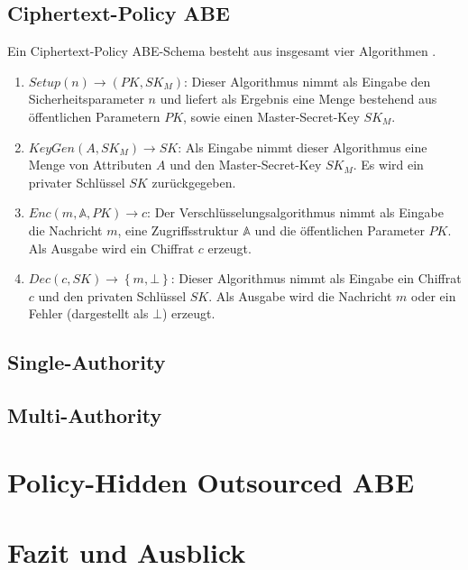 \documentclass{hsflensburg}
\begin{document}
	\subsection{Ciphertext-Policy ABE}
	Ein Ciphertext-Policy ABE-Schema besteht aus insgesamt vier Algorithmen
	\cite{cp-abe}.

	\begin{enumerate}
		\item $\textit{Setup}\left(n\right) \to \left(PK, SK_M\right)$: Dieser
			Algorithmus nimmt als Eingabe den Sicherheitsparameter $n$ und liefert als
			Ergebnis eine Menge bestehend aus öffentlichen Parametern $PK$, sowie
			einen Master-Secret-Key $SK_M$.
		\item $\textit{KeyGen}\left(A, SK_M\right) \to SK$: Als Eingabe
			nimmt dieser Algorithmus eine Menge von Attributen $A$ und den
			Master-Secret-Key $SK_M$. Es wird ein privater Schlüssel $SK$
			zurückgegeben.
		\item $Enc\left(m, \mathbb{A}, PK\right) \to c$: Der
			Verschlüsselungsalgorithmus nimmt als Eingabe die Nachricht $m$, eine
			Zugriffsstruktur $\mathbb{A}$ und die öffentlichen Parameter $PK$.  Als
			Ausgabe wird ein Chiffrat $c$ erzeugt.
		\item $Dec\left(c, SK\right) \to \left\{m, \bot\right\}$: Dieser Algorithmus
			nimmt als Eingabe ein Chiffrat $c$ und den privaten Schlüssel $SK$. Als
			Ausgabe wird die Nachricht $m$ oder ein Fehler (dargestellt als $\bot$)
			erzeugt.
	\end{enumerate}
	\subsection{Single-Authority}
	\subsection{Multi-Authority}

	\section{Policy-Hidden Outsourced ABE}
	\section{Fazit und Ausblick}

	\newpage
	
	
\end{document}
